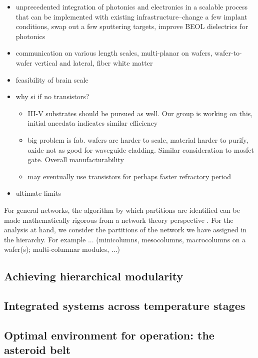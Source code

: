 \documentclass[twocolumn]{article}
\begin{document}
\begin{itemize}
\item unprecedented integration of photonics and electronics in a scalable process that can be implemented with existing infrastructure--change a few implant conditions, swap out a few sputtering targets, improve BEOL dielectrics for photonics
\item communication on various length scales, multi-planar on wafers, wafer-to-wafer vertical and lateral, fiber white matter
\item feasibility of brain scale
\item why si if no transistors?
\begin{itemize}
\item III-V substrates should be pursued as well. Our group is working on this, initial anecdata indicates similar efficiency
\item big problem is fab. wafers are harder to scale, material harder to purify, oxide not as good for waveguide cladding. Similar consideration to mosfet gate. Overall manufacturability
\item may eventually use transistors for perhaps faster refractory period
\end{itemize}
\item ultimate limits
\end{itemize}


For general networks, the algorithm by which partitions are identified can be made mathematically rigorous from a network theory perspective \cite{oz1992,oz2004}. For the analysis at hand, we consider the partitions of the network we have assigned in the hierarchy. For example ... (minicolumns, mesocolumns, macrocolumns on a wafer(s); multi-columnar modules, ...) 
\subsection{Achieving hierarchical modularity}

\subsection{Integrated systems across temperature stages}

\subsection{Optimal environment for operation: the asteroid belt}
\end{document}
